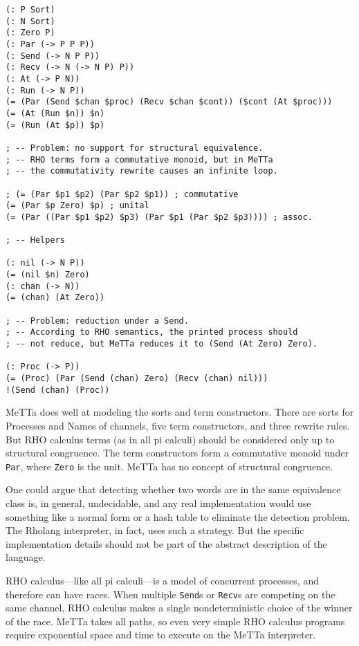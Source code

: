 \documentclass{article}
\begin{document}
\begin{verbatim}
(: P Sort)
(: N Sort)
(: Zero P)
(: Par (-> P P P))
(: Send (-> N P P))
(: Recv (-> N (-> N P) P))
(: At (-> P N))
(: Run (-> N P))
(= (Par (Send $chan $proc) (Recv $chan $cont)) ($cont (At $proc)))
(= (At (Run $n)) $n)
(= (Run (At $p)) $p)

; -- Problem: no support for structural equivalence.
; -- RHO terms form a commutative monoid, but in MeTTa
; -- the commutativity rewrite causes an infinite loop.

; (= (Par $p1 $p2) (Par $p2 $p1)) ; commutative
(= (Par $p Zero) $p) ; unital
(= (Par ((Par $p1 $p2) $p3) (Par $p1 (Par $p2 $p3)))) ; assoc.

; -- Helpers

(: nil (-> N P))
(= (nil $n) Zero)
(: chan (-> N))
(= (chan) (At Zero))

; -- Problem: reduction under a Send.
; -- According to RHO semantics, the printed process should
; -- not reduce, but MeTTa reduces it to (Send (At Zero) Zero).

(: Proc (-> P))
(= (Proc) (Par (Send (chan) Zero) (Recv (chan) nil)))
!(Send (chan) (Proc))
\end{verbatim}

\noindent MeTTa does well at modeling the sorts and term constructors.  There are sorts for Processes and Names of channels, five term constructors, and three rewrite rules.  But RHO calculus terms (as in all pi calculi) should be considered only up to structural congruence.  The term constructors form a commutative monoid under \verb+Par+, where \verb+Zero+ is the unit.  MeTTa has no concept of structural congruence.

One could argue that detecting whether two words are in the same equivalence class is, in general, undecidable, and any real implementation would use something like a normal form or a hash table to eliminate the detection problem.  The Rholang interpreter, in fact, uses such a strategy.  But the specific implementation details should not be part of the abstract description of the language.

RHO calculus---like all pi calculi---is a model of concurrent processes, and therefore can have races.  When multiple \verb+Send+s or \verb+Recv+s are competing on the same channel, RHO calculus makes a single nondeterministic choice of the winner of the race.  MeTTa takes all paths, so even very simple RHO calculus programs require exponential space and time to execute on the MeTTa interpreter.
\end{document}
